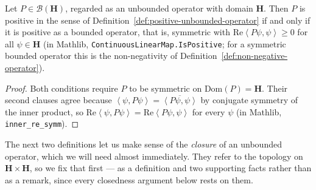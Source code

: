 \begin{lemma}
    \label{lmm:positive-bounded-agrees}
    \leanok
    Let $P \in \mathcal{B}(\mathbf{H})$, regarded as an unbounded operator with domain $\mathbf{H}$. Then $P$ is positive in the sense of Definition~\ref{def:positive-unbounded-operator} if and only if it is positive as a bounded operator, that is, symmetric with $\text{Re}\left< P\psi, \psi \right> \ge 0$ for all $\psi \in \mathbf{H}$ (in Mathlib, \texttt{ContinuousLinearMap.IsPositive}; for a symmetric bounded operator this is the non-negativity of Definition~\ref{def:non-negative-operator}).
\end{lemma}
\begin{proof}
    \leanok
    Both conditions require $P$ to be symmetric on $\text{Dom}(P) = \mathbf{H}$. Their second clauses agree because $\left< \psi, P\psi \right> = \overline{\left< P\psi, \psi \right>}$ by conjugate symmetry of the inner product, so $\text{Re}\left< \psi, P\psi \right> = \text{Re}\left< P\psi, \psi \right>$ for every $\psi$ (in Mathlib, \texttt{inner\_re\_symm}).
\end{proof}

The next two definitions let us make sense of the \textit{closure} of an unbounded operator, which we will need almost immediately. They refer to the topology on $\mathbf{H} \times \mathbf{H}$, so we fix that first — as a definition and two supporting facts rather than as a remark, since every closedness argument below rests on them.

